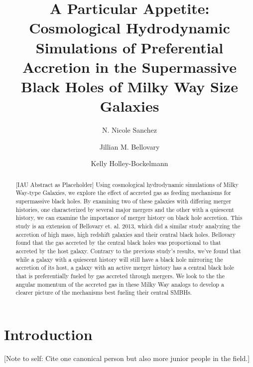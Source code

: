 \documentclass[manuscript]{aastex}
\begin{document}
 

\title{A Particular Appetite: Cosmological Hydrodynamic Simulations of Preferential Accretion in the Supermassive Black Holes of Milky Way Size Galaxies}



\author{N. Nicole Sanchez }
\author{Jillian M. Bellovary}
\author{Kelly Holley-Bockelmann}



\begin{abstract}\label{abs:abstractlabel}

[IAU Abstract as Placeholder] Using cosmological hydrodynamic simulations of Milky Way-type Galaxies, we explore the effect of accreted gas as feeding mechanisms for supermassive black holes. By examining two of these galaxies with differing merger histories, one characterized by several major mergers and the other with a quiescent history, we can examine the importance of merger history on black hole accretion. This study is an extension of Bellovary et. al. 2013, which did a similar study analyzing the accretion of high mass, high redshift galaxies and their central black holes. Bellovary found that the gas accreted by the central black holes was proportional to that accreted by the host galaxy. Contrary to the previous study's results, we've found that while a galaxy with a quiescent history will still have a black hole mirroring the accretion of its host, a galaxy with an active merger history has a central black hole that is preferentially fueled by gas accreted through mergers. We look to the the angular momentum of the accreted gas in these Milky Way analogs to develop a clearer picture of the mechanisms best fueling their central SMBHs.

\end{abstract}


\section{Introduction}\label{sec-intro}

[Note to self: Cite one canonical person but also more junior people in the field.]
\end{document}
